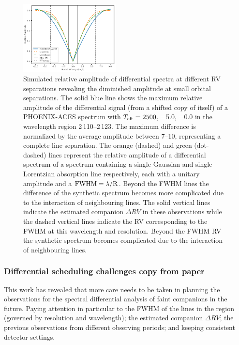 \begin{figure}
    \centering
    \includegraphics[width=0.45\textwidth]{figures/direct-recovery/rv_diff_final.pdf}
    \caption{Simulated relative amplitude of differential spectra at different {RV} separations revealing the diminished amplitude at small orbital separations. The solid blue line shows the maximum relative amplitude of the differential signal (from a shifted copy of itself) of a {PHOENIX-ACES} spectrum with \(T_{\mathrm{eff}}{}=2500\)\K{}, \logg{}=5.0, \feh{}=0.0 in the wavelength region 2\,110--2\,123\nm{}. The maximum difference is normalized by the average amplitude between 7--10\kmps{}, representing a complete line separation. The orange (dashed) and green (dot-dashed) lines represent the relative amplitude of a differential spectrum of a spectrum containing a single Gaussian and single Lorentzian absorption line respectively, each with a unitary amplitude and a \(\rm {FWHM} = \lambda / R\). Beyond the {FWHM} lines the difference of the synthetic spectrum becomes more complicated due to the interaction of neighbouring lines. The solid vertical lines indicate the estimated companion \(\Delta {RV}\) in these observations while the dashed vertical lines indicate the {RV} corresponding to the {FWHM} at this wavelength and resolution. Beyond the {FWHM} {RV} the synthetic spectrum becomes complicated due to the interaction of neighbouring lines.}
    \label{fig:diff_amp}
\end{figure}









\subsubsection{Differential scheduling challenges {copy from paper}}
\label{subsubsec:differential-schedualing}
This work has revealed that more care needs to be taken in planning the observations for the spectral differential analysis of faint companions in the future.
Paying attention in particular to the {FWHM} of the lines in the region (governed by resolution and wavelength); the estimated companion \(\Delta {RV}\); the previous observations from different observing periods; and keeping consistent detector settings.

